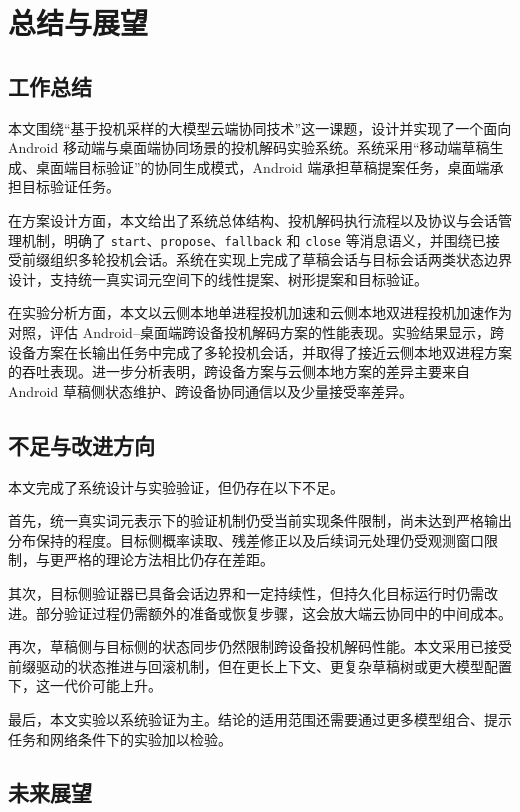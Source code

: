 \section{总结与展望}

\subsection{工作总结}

本文围绕“基于投机采样的大模型云端协同技术”这一课题，设计并实现了一个面向 Android 移动端与桌面端协同场景的投机解码实验系统。系统采用“移动端草稿生成、桌面端目标验证”的协同生成模式，Android 端承担草稿提案任务，桌面端承担目标验证任务。

在方案设计方面，本文给出了系统总体结构、投机解码执行流程以及协议与会话管理机制，明确了 \texttt{start}、\texttt{propose}、\texttt{fallback} 和 \texttt{close} 等消息语义，并围绕已接受前缀组织多轮投机会话。系统在实现上完成了草稿会话与目标会话两类状态边界设计，支持统一真实词元空间下的线性提案、树形提案和目标验证。

在实验分析方面，本文以云侧本地单进程投机加速和云侧本地双进程投机加速作为对照，评估 Android--桌面端跨设备投机解码方案的性能表现。实验结果显示，跨设备方案在长输出任务中完成了多轮投机会话，并取得了接近云侧本地双进程方案的吞吐表现。进一步分析表明，跨设备方案与云侧本地方案的差异主要来自 Android 草稿侧状态维护、跨设备协同通信以及少量接受率差异。

\subsection{不足与改进方向}

本文完成了系统设计与实验验证，但仍存在以下不足。

首先，统一真实词元表示下的验证机制仍受当前实现条件限制，尚未达到严格输出分布保持的程度。目标侧概率读取、残差修正以及后续词元处理仍受观测窗口限制，与更严格的理论方法相比仍存在差距。

其次，目标侧验证器已具备会话边界和一定持续性，但持久化目标运行时仍需改进。部分验证过程仍需额外的准备或恢复步骤，这会放大端云协同中的中间成本。

再次，草稿侧与目标侧的状态同步仍然限制跨设备投机解码性能。本文采用已接受前缀驱动的状态推进与回滚机制，但在更长上下文、更复杂草稿树或更大模型配置下，这一代价可能上升。

最后，本文实验以系统验证为主。结论的适用范围还需要通过更多模型组合、提示任务和网络条件下的实验加以检验。

\subsection{未来展望}

